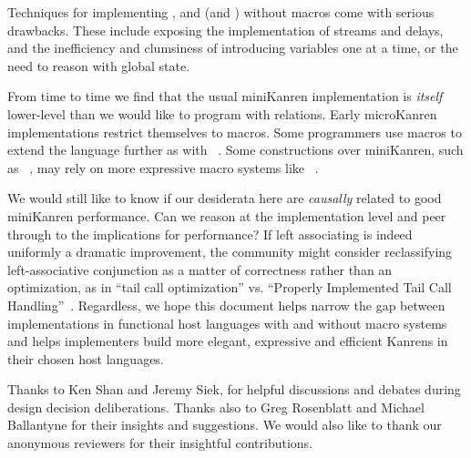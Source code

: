 \documentclass[sigplan,balance,pbalance,natbib=false]{acmart}
\begin{document}
Techniques for implementing , 
and  (and ) without macros come with
serious drawbacks. These include exposing the implementation of
streams and delays, and the inefficiency and clumsiness of introducing
variables one at a time, or the need to reason with global state.

From time to time we find that the usual miniKanren implementation is
\emph{itself} lower-level than we would like to program with
relations. Early microKanren implementations restrict themselves
to  macros. Some programmers use macros to
extend the language further as
with ~\cite{keep2009pattern}. Some constructions
over miniKanren, such
as ~\cite{ballantyne2020macros}, may rely on
more expressive macro systems
like ~\cite{culpepper2012fortifying}.

We would still like to know if our desiderata here are \emph{causally}
related to good miniKanren performance. Can we reason at the
implementation level and peer through to the implications for
performance? If left associating  is indeed uniformly
a dramatic improvement, the community might consider reclassifying
left-associative conjunction as a matter of correctness rather than an
optimization, as in \enquote{tail call optimization} vs.
\enquote{Properly Implemented Tail Call
  Handling}~\cite{felleisen2014requestions}. Regardless, we hope this
document helps narrow the gap between implementations in functional
host languages with and without macro systems and helps implementers
build more elegant, expressive and efficient Kanrens in their chosen
host languages.

\begin{acks}

  Thanks to Ken Shan and Jeremy Siek, for helpful discussions and
  debates during design decision deliberations. Thanks also to Greg
  Rosenblatt and Michael Ballantyne for their insights and
  suggestions. We would also like to thank our anonymous reviewers
  for their insightful contributions.

\end{acks}

\printbibliography{}
\end{document}
